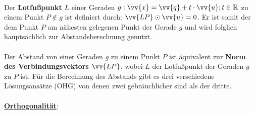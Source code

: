 \documentclass[main.tex]{subfiles}
\begin{document}
        \begin{Definition}
            \paragraph{} Der \textbf{Lotfußpunkt} $L$ einer Geraden $g:\vv{x}=\vv{q}+t\cdot\vv{u};t\in\R$ zu einem Punkt $P\notin g$
            ist definiert durch: $\vv{LP}\odot\vv{u}=0$. Er ist somit der dem Punkt $P$ am nähesten gelegenen Punkt der Gerade $g$ und wird
            folglich hauptsächlich zur Abstandsberechnung genutzt.
        \end{Definition}

        \paragraph{} Der Abstand von einer Geraden $g$ zu einem Punkt $P$ ist äquivalent zur \textbf{Norm des Verbindungsvektors $\vv{LP}$}, wobei $L$
        der Lotfußpunkt der Geraden $g$ zu $P$ ist. Für die Berechnung des Abstands gibt es drei verschiedene Lösungsansätze (OHG) von denen zwei
        gebräuchlicher sind als der dritte.
        \\
        \\
        \underline{\textbf{Orthogonalität}}:
\end{document}
